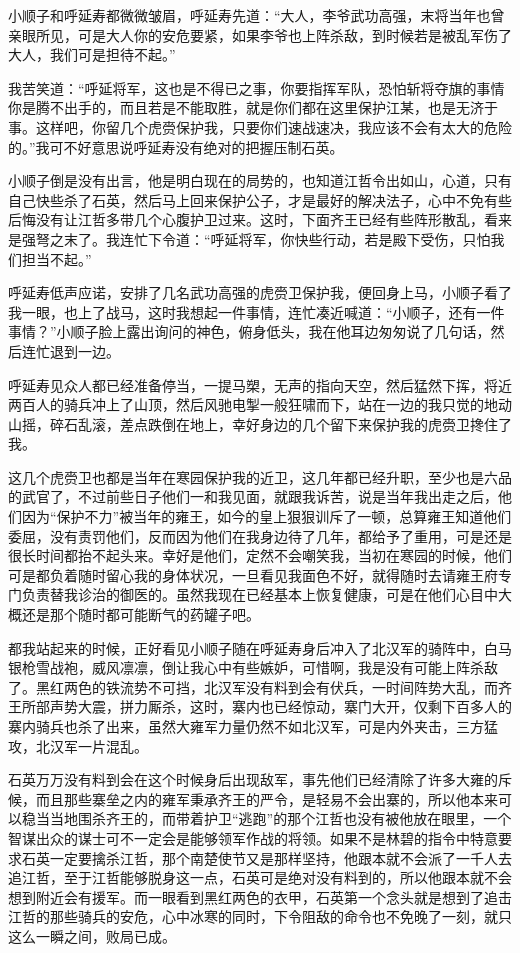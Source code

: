 小顺子和呼延寿都微微皱眉，呼延寿先道：“大人，李爷武功高强，末将当年也曾亲眼所见，可是大人你的安危要紧，如果李爷也上阵杀敌，到时候若是被乱军伤了大人，我们可是担待不起。”

我苦笑道：“呼延将军，这也是不得已之事，你要指挥军队，恐怕斩将夺旗的事情你是腾不出手的，而且若是不能取胜，就是你们都在这里保护江某，也是无济于事。这样吧，你留几个虎赍保护我，只要你们速战速决，我应该不会有太大的危险的。”我可不好意思说呼延寿没有绝对的把握压制石英。

小顺子倒是没有出言，他是明白现在的局势的，也知道江哲令出如山，心道，只有自己快些杀了石英，然后马上回来保护公子，才是最好的解决法子，心中不免有些后悔没有让江哲多带几个心腹护卫过来。这时，下面齐王已经有些阵形散乱，看来是强弩之末了。我连忙下令道：“呼延将军，你快些行动，若是殿下受伤，只怕我们担当不起。”

呼延寿低声应诺，安排了几名武功高强的虎赍卫保护我，便回身上马，小顺子看了我一眼，也上了战马，这时我想起一件事情，连忙凑近喊道：“小顺子，还有一件事情？”小顺子脸上露出询问的神色，俯身低头，我在他耳边匆匆说了几句话，然后连忙退到一边。

呼延寿见众人都已经准备停当，一提马槊，无声的指向天空，然后猛然下挥，将近两百人的骑兵冲上了山顶，然后风驰电掣一般狂啸而下，站在一边的我只觉的地动山摇，碎石乱滚，差点跌倒在地上，幸好身边的几个留下来保护我的虎赍卫搀住了我。

这几个虎赍卫也都是当年在寒园保护我的近卫，这几年都已经升职，至少也是六品的武官了，不过前些日子他们一和我见面，就跟我诉苦，说是当年我出走之后，他们因为“保护不力”被当年的雍王，如今的皇上狠狠训斥了一顿，总算雍王知道他们委屈，没有责罚他们，反而因为他们在我身边待了几年，都给予了重用，可是还是很长时间都抬不起头来。幸好是他们，定然不会嘲笑我，当初在寒园的时候，他们可是都负着随时留心我的身体状况，一旦看见我面色不好，就得随时去请雍王府专门负责替我诊治的御医的。虽然我现在已经基本上恢复健康，可是在他们心目中大概还是那个随时都可能断气的药罐子吧。

都我站起来的时候，正好看见小顺子随在呼延寿身后冲入了北汉军的骑阵中，白马银枪雪战袍，威风凛凛，倒让我心中有些嫉妒，可惜啊，我是没有可能上阵杀敌了。黑红两色的铁流势不可挡，北汉军没有料到会有伏兵，一时间阵势大乱，而齐王所部声势大震，拼力厮杀，这时，寨内也已经惊动，寨门大开，仅剩下百多人的寨内骑兵也杀了出来，虽然大雍军力量仍然不如北汉军，可是内外夹击，三方猛攻，北汉军一片混乱。

石英万万没有料到会在这个时候身后出现敌军，事先他们已经清除了许多大雍的斥候，而且那些寨垒之内的雍军秉承齐王的严令，是轻易不会出寨的，所以他本来可以稳当当地围杀齐王的，而带着护卫“逃跑”的那个江哲也没有被他放在眼里，一个智谋出众的谋士可不一定会是能够领军作战的将领。如果不是林碧的指令中特意要求石英一定要擒杀江哲，那个南楚使节又是那样坚持，他跟本就不会派了一千人去追江哲，至于江哲能够脱身这一点，石英可是绝对没有料到的，所以他跟本就不会想到附近会有援军。而一眼看到黑红两色的衣甲，石英第一个念头就是想到了追击江哲的那些骑兵的安危，心中冰寒的同时，下令阻敌的命令也不免晚了一刻，就只这么一瞬之间，败局已成。

